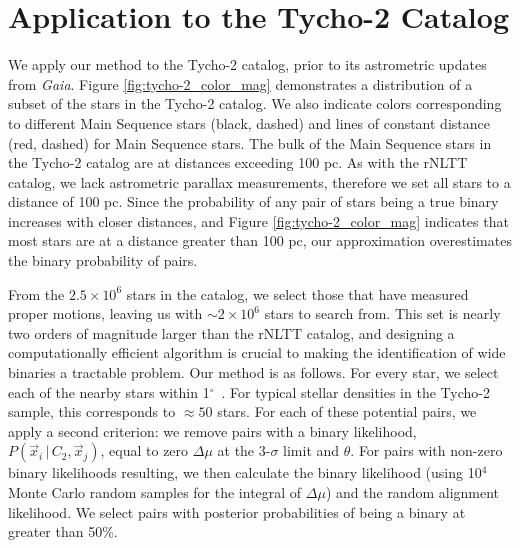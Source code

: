 \documentclass[usenatbib]{mnras}
\newcommand{\given}{\,|\,}
\newcommand{\degree}{\ifmmode {^\circ}\else$^\circ$\ \fi}
\begin{document}
\section{Application to the Tycho-2 Catalog}

We apply our method to the Tycho-2 catalog, prior to its astrometric updates from {\it Gaia}. Figure \ref{fig:tycho-2_color_mag} demonstrates a distribution of a subset of the stars in the Tycho-2 catalog. We also indicate colors corresponding to different Main Sequence stars (black, dashed) and lines of constant distance (red, dashed) for Main Sequence stars. The bulk of the Main Sequence stars in the Tycho-2 catalog are at distances exceeding 100 pc. As with the rNLTT catalog, we lack astrometric parallax measurements, therefore we set all stars to a distance of 100 pc. Since the probability of any pair of stars being a true binary increases with closer distances, and Figure \ref{fig:tycho-2_color_mag} indicates that most stars are at a distance greater than 100 pc, our approximation overestimates the binary probability of pairs.


From the $2.5\times10^6$ stars in the catalog, we select those that have measured proper motions, leaving us with $\sim2\times10^6$ stars to search from. This set is nearly two orders of magnitude larger than the rNLTT catalog, and designing a computationally efficient algorithm is crucial to making the identification of wide binaries a tractable problem. Our method is as follows. For every star, we select each of the nearby stars within 1\degree. For typical stellar densities in the Tycho-2 sample, this corresponds to $\approx50$ stars. For each of these potential pairs, we apply a second criterion: we remove pairs with a binary likelihood, $P(\vec{x}_i \given C_2, \vec{x}_j)$, equal to zero $\Delta \mu$ at the 3-$\sigma$ limit and $\theta$. For pairs with non-zero binary likelihoods resulting, we then calculate the binary likelihood (using 10$^4$ Monte Carlo random samples for the integral of $\Delta \mu$) and the random alignment likelihood. We select pairs with posterior probabilities of being a binary at greater than 50\%.
 
 
 
\end{document}
